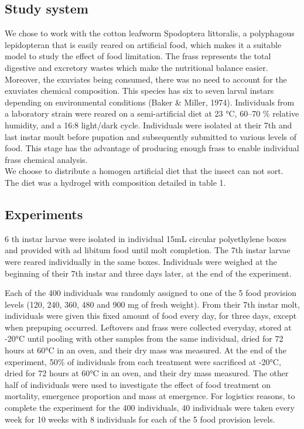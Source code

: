 \documentclass[
  12pt,
]{article}
\begin{document}
\subsection{Study system}\label{study-system}

We chose to work with the cotton leafworm Spodoptera littoralis, a
polyphagous lepidopteran that is easily reared on artificial food, which
makes it a suitable model to study the effect of food limitation. The
frass represents the total digestive and excretory wastes which make the
nutritional balance easier. Moreover, the exuviates being consumed,
there was no need to account for the exuviates chemical composition.
This species has six to seven larval instars depending on environmental
conditions (Baker \& Miller, 1974). Individuals from a laboratory strain
were reared on a semi-artificial diet at 23 °C, 60--70 \% relative
humidity, and a 16:8 light/dark cycle. Individuals were isolated at
their 7th and last instar moult before pupation and subsequently
submitted to various levels of food. This stage has the advantage of
producing enough frass to enable individual frass chemical analysis.\\
We choose to distribute a homogen artificial diet that the insect can
not sort. The diet was a hydrogel with composition detailed in table 1.

\subsection{Experiments}\label{experiments}

6 th instar larvae were isolated in individual 15mL circular
polyethylene boxes and provided with ad libitum food until molt
completion. The 7th instar larvae were reared individually in the same
boxes. Individuals were weighed at the beginning of their 7th instar and
three days later, at the end of the experiment.

Each of the 400 individuals was randomly assigned to one of the 5 food
provision levels (120, 240, 360, 480 and 900 mg of fresh weight). From
their 7th instar molt, individuals were given this fixed amount of food
every day, for three days, except when prepuping occurred. Leftovers and
frass were collected everyday, stored at -20°C until pooling with other
samples from the same individual, dried for 72 hours at 60°C in an oven,
and their dry mass was measured. At the end of the experiment, 50\% of
individuals from each treatment were sacrificed at -20°C, dried for 72
hours at 60°C in an oven, and their dry mass measured. The other half of
individuals were used to investigate the effect of food treatment on
mortality, emergence proportion and mass at emergence. For logistics
reasons, to complete the experiment for the 400 individuals, 40
individuals were taken every week for 10 weeks with 8 individuals for
each of the 5 food provision levels.
\end{document}
